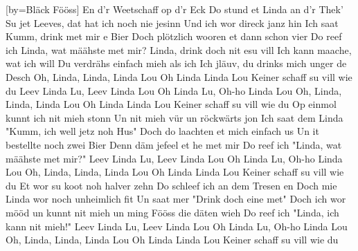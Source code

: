 
[by={Bläck Fööss}]
\beginverse
En d'r Weetschaff op d'r Eck
Do stund et Linda an d'r Thek'
Su jet Leeves, dat hat ich noch nie jesinn
Und ich wor direck janz hin
Ich saat Kumm, drink met mir e Bier
Doch plötzlich wooren et dann schon vier
Do reef ich Linda, wat määhste met mir?
\endverse
\beginverse
Linda, drink doch nit esu vill
Ich kann maache, wat ich will
Du verdrähs einfach mieh als ich
Ich jläuv, du drinks mich unger de Desch
Oh, Linda, Linda, Linda Lou
Oh Linda Linda Lou
Keiner schaff su vill wie du
\endverse
\beginchorus
Leev Linda Lu, Leev Linda Lou
Oh Linda Lu, Oh-ho Linda Lou
Oh, Linda, Linda, Linda Lou
Oh Linda Linda Lou
Keiner schaff su vill wie du
\endchorus
\beginverse
Op einmol kunnt ich nit mieh stonn
Un nit mieh vür un röckwärts jon
Ich saat dem Linda "Kumm, ich well jetz noh Hus"
Doch do laachten et mich einfach us
Un it bestellte noch zwei Bier
Denn däm jefeel et he met mir
Do reef ich "Linda, wat määhste met mir?"
\endverse
\beginchorus
Leev Linda Lu, Leev Linda Lou
Oh Linda Lu, Oh-ho Linda Lou
Oh, Linda, Linda, Linda Lou
Oh Linda Linda Lou
Keiner schaff su vill wie du
\endchorus
\beginverse
Et wor su koot noh halver zehn
Do schleef ich an dem Tresen en
Doch mie Linda wor noch unheimlich fit
Un saat mer "Drink doch eine met"
Doch ich wor mööd un kunnt nit mieh
un ming Fööss die däten wieh
Do reef ich "Linda, ich kann nit mieh!"
\endverse
\beginchorus
Leev Linda Lu, Leev Linda Lou
Oh Linda Lu, Oh-ho Linda Lou
Oh, Linda, Linda, Linda Lou
Oh Linda Linda Lou
Keiner schaff su vill wie du
\endchorus



\endsong